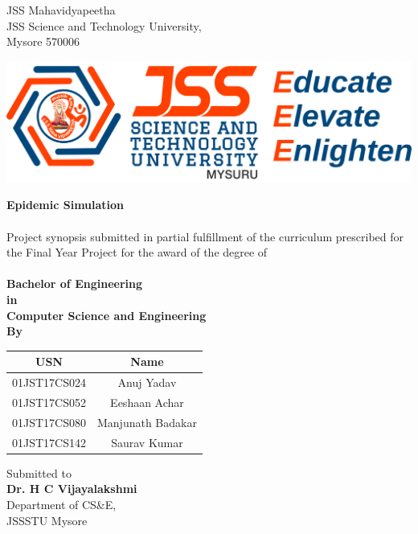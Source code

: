 \documentclass[14pt, a4paper]{extarticle}
\begin{document}
    	\thispagestyle{empty}
    	\begin{center}
    		JSS Mahavidyapeetha \\JSS Science and Technology University, \\Mysore 570006
    		
    		\vspace{0.25in}
    		\includegraphics[scale=1.25]{images/jssstulogo.jpg}
    		
    		\vspace{0.75in}
    		{\Large \textbf{Epidemic Simulation}}
    		
    		\paragraph{}
    		Project synopsis submitted in partial fulfillment of the curriculum prescribed for the Final Year Project for the award of the degree of
    		
    		\paragraph{}
    		\textbf {Bachelor of Engineering \\in \\Computer Science and Engineering \\By}
    
            \vspace{0.25in}
            \begin{table}[h!]
                \begin{center}
                    \begin{tabular}{|c|c|}
                    \hline
                    \textbf{USN} & \textbf{Name}\\
                    \hline
                    01JST17CS024 & Anuj Yadav \\
                    01JST17CS052 & Eeshaan Achar \\
                    01JST17CS080 & Manjunath Badakar \\
                    01JST17CS142 & Saurav Kumar \\
                    \hline
                    \end{tabular}
                \end{center}
            \end{table}
    
            \vspace{0.75in}
            Submitted to \\\textbf{Dr. H C Vijayalakshmi} \\Department of CS\&E, \\JSSSTU Mysore
        \end{center}
    
\end{document}
